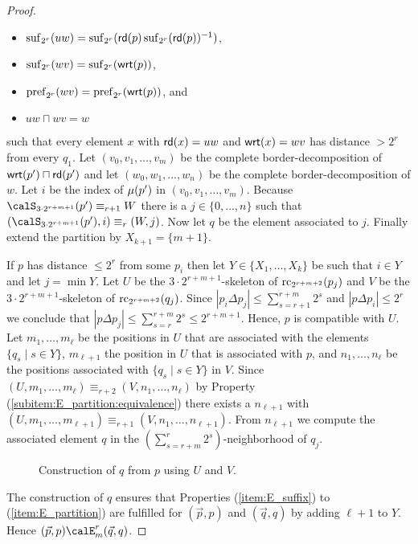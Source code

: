 \begin{proof}
	\begin{minipage}{0.55\linewidth}
	\begin{itemize}
		\item $\operatorname{suf}_{2^{r}}(uw) = \operatorname{suf}_{2^{r}}(\mathsf{rd}(p)\operatorname{suf}_{2^{r}}(\mathsf{rd}(p))^{-1} )$,
		\item $\operatorname{suf}_{2^{r}}(wv) = \operatorname{suf}_{2^{r}}(\mathsf{wrt}(p))$,
	\end{itemize}
    \end{minipage}
    \begin{minipage}{0.44\linewidth}
    	\begin{itemize}
    		\item $\operatorname{pref}_{2^{r}}(wv) = \operatorname{pref}_{2^{r}}(\mathsf{wrt}(p))$, and
    		\item $uw\sqcap wv = w$
    	\end{itemize}
    \end{minipage}
    such that every element $x$ with $\mathsf{rd}(x) = uw$ and $\mathsf{wrt}(x) = wv$ has distance $> 2^r$ from every $q_1$.
	Let $(v_0,v_1,\ldots, v_m)$ be the complete border-decomposition of $\mathsf{wrt}(p')\sqcap \mathsf{rd}(p')$ and let $(w_0, w_1,\ldots, w_n)$ be the complete border-decomposition of $w$. Let $i$
	be the index of $\mu(p')$ in $(v_0,v_1,\ldots, v_m)$. Because $\calS_{3\cdot 2^{r+m+1}}(p') \equiv_{r+1} W$ there is a $j\in \{0,\ldots,n\}$ such that $(\calS_{3\cdot 2^{r+m+1}}(p'), i) \equiv_r (W,j)$.
	Now let $q$ be the element associated to $j$. Finally extend the partition by $X_{k+1} = \{m+1\}$.
	
	
	If $p$ has distance $\leq 2^{r}$ from some $p_i$ then let $Y\in \{X_1,\ldots,X_k\}$ be such that $i\in Y$ and let $j=\min Y$. Let $U$ be the $3\cdot 2^{r+m+1}$-skeleton of $\operatorname{rc}_{2^{r+m+2}}(p_j)$ and 
	$V$ be the $3\cdot 2^{r+m+1}$-skeleton of $\operatorname{rc}_{2^{r+m+2}}(q_j)$.
	Since $|p_i\Delta p_j| \leq \sum_{s=r+1}^{r+m} 2^s$ and $|p\Delta p_i| \leq 2^r$ we conclude that $|p\Delta p_j| \leq \sum_{s=r}^{r+m} 2^s \leq 2^{r+m+1}$. Hence, $p$ is compatible with $U$. Let $m_1,\ldots,m_\ell$ be the positions in $U$ that are associated with the elements $\{q_s \mid s\in Y\}$, $m_{\ell+1}$ the position in $U$ that is associated with $p$, and $n_1,\ldots,n_\ell$ be the positions associated with $\{q_s \mid s\in Y\}$ in $V$. Since $(U,m_1,\ldots,m_\ell) \equiv_{r+2} (V,n_1,\ldots,n_\ell)$ by Property (\ref{subitem:E_partition:equivalence}) there exists a $n_{\ell+1}$ with $(U,m_1,\ldots,m_{\ell+1}) \equiv_{r+1} (V,n_1,\ldots,n_{\ell+1})$. From $n_{\ell+1}$ we compute the associated element $q$
	in the $(\sum_{s= r+m}^{r} 2^s)$-neighborhood of $q_j$.
	\begin{figure}[h]
		\centering
		\caption{\label{fig:skeleton}Construction of $q$ from $p$ using $U$ and $V$.}
	\end{figure}
	The construction of $q$ ensures that Properties (\ref{item:E_suffix}) to (\ref{item:E_partition}) are fulfilled for $(\vec{p}, p)$ and $(\vec{q}, q)$ by adding $\ell+1$ to $Y$. Hence $(\vec{p}, p) \calE^r_m (\vec{q}, q)$.
\end{proof}

